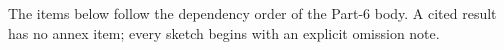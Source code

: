 \label{annex:p06}

The items below follow the dependency order of the Part-6 body.  A cited
result has no annex item; every sketch begins with an explicit omission note.






\clearpage
{\pagestyle{empty}\cleardoublepage}
